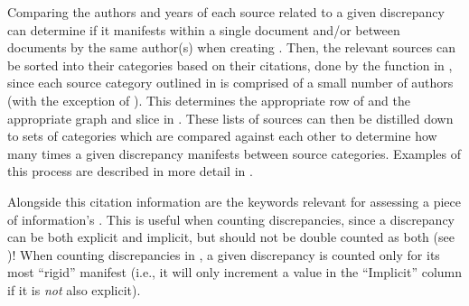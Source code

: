 Comparing the authors and years of each source related to a given discrepancy
can determine if it manifests within a single document and/or between documents
by the same author(s) when creating . Then, the
relevant sources can be sorted into their categories based on their citations,
done by the function in , since each source category
outlined in  is comprised of a small number of authors (with the
exception of \papers{}).
This determines the appropriate row of  and the appropriate
graph and slice in . These lists of sources can then
be distilled down to sets of categories which are compared against
each other to determine how many times a given discrepancy manifests between
source categories. Examples of this process are described in more detail in
.

\label{auto-discrep-analysis-rigidity}
Alongside this citation information are the keywords relevant for assessing a
piece of information's . This is useful when counting
discrepancies, since a discrepancy can be both explicit and implicit, but
should not be double counted as both (see )! When counting
discrepancies in , a given discrepancy is counted only for
its most ``rigid'' manifest (i.e., it will only increment a value in the
``Implicit'' column if it is \emph{not} also explicit).

